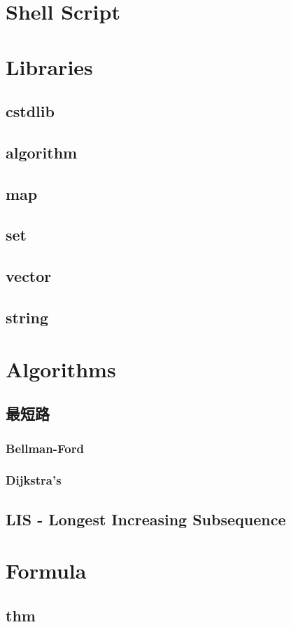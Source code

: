 \section{Shell Script}
    

\section{Libraries}
    \subsection{cstdlib}
        
    \subsection{algorithm}
        
    \subsection{map}
        
    \subsection{set}
        
    \subsection{vector}
        
    \subsection{string}
        

\section{Algorithms}
    \subsection{最短路}
        \subsubsection{Bellman-Ford}
        \subsubsection{Dijkstra’s}
    \subsection{LIS - Longest Increasing Subsequence}

\section{Formula}
    \subsection{thm}
        